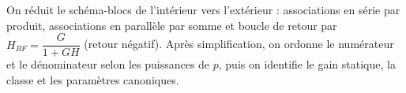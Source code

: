 \begin{corrigebox}[Corrigé]
On réduit le schéma-blocs de l'intérieur vers l'extérieur : associations en série par produit, associations en parallèle par somme et boucle de retour par $H_{BF}=\dfrac{G}{1+GH}$ (retour négatif). Après simplification, on ordonne le numérateur et le dénominateur selon les puissances de $p$, puis on identifie le gain statique, la classe et les paramètres canoniques.
\end{corrigebox}
